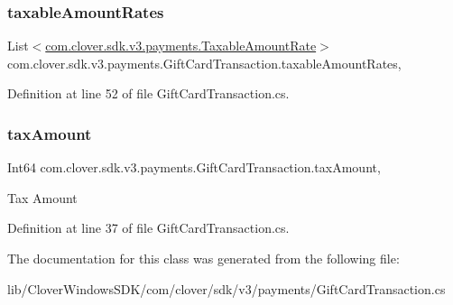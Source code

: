 \subsubsection{\texorpdfstring{taxable\+Amount\+Rates}{taxableAmountRates}}
{\footnotesize\ttfamily List$<$\hyperlink{classcom_1_1clover_1_1sdk_1_1v3_1_1payments_1_1_taxable_amount_rate}{com.\+clover.\+sdk.\+v3.\+payments.\+Taxable\+Amount\+Rate}$>$ com.\+clover.\+sdk.\+v3.\+payments.\+Gift\+Card\+Transaction.\+taxable\+Amount\+Rates\hspace{0.3cm}{\ttfamily [get]}, {\ttfamily [set]}}



Definition at line 52 of file Gift\+Card\+Transaction.\+cs.

\mbox{\label{classcom_1_1clover_1_1sdk_1_1v3_1_1payments_1_1_gift_card_transaction_a2c46346c29a55029673305b57344326d}} 
\subsubsection{\texorpdfstring{tax\+Amount}{taxAmount}}
{\footnotesize\ttfamily Int64 com.\+clover.\+sdk.\+v3.\+payments.\+Gift\+Card\+Transaction.\+tax\+Amount\hspace{0.3cm}{\ttfamily [get]}, {\ttfamily [set]}}



Tax Amount 



Definition at line 37 of file Gift\+Card\+Transaction.\+cs.



The documentation for this class was generated from the following file\+:\begin{DoxyCompactItemize}
\item 
lib/\+Clover\+Windows\+S\+D\+K/com/clover/sdk/v3/payments/Gift\+Card\+Transaction.\+cs\end{DoxyCompactItemize}
